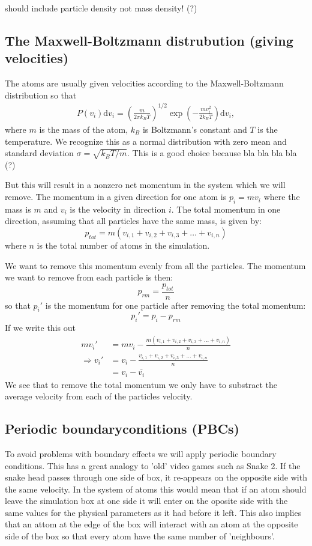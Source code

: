 \documentclass[11pt,a4wide]{article}
\newcommand{\dm}[1]{\mathrm{d}#1}
\begin{document}
should include particle density not mass density! (?)


\subsection{The Maxwell-Boltzmann distrubution (giving velocities)}
The atoms are usually given velocities according to the Maxwell-Boltzmann distribution so that
\begin{align}
	\label{eq:maxwell_boltzmann}
	P(v_i)\dm{v_i} = \left(\frac{m}{2\pi k_B T}\right)^{1/2} \exp\left(-\frac{m v_i^2}{2k_B T}\right) \dm{v_i},
\end{align}
where $m$ is the mass of the atom, $k_B$ is Boltzmann's constant and $T$ is the temperature. We recognize this as a normal distribution with zero mean and standard deviation $\sigma = \sqrt{k_B T/m}$. This is a good choice because bla bla bla bla (?) 


But this will result in a nonzero net momentum in the system which we will remove. The momentum in a given direction for one atom is $p_{i} = mv_i$ where the mass is $m$ and $v_i$ is the velocity in direction $i$. The total momentum in one direction, assuming that all particles have the same mass, is given by:
\[
p_{tot} = m(v_{i,1} + v_{i,2} + v_{i,3} + \dots + v_{i,n})
\]
where $n$ is the total number of atoms in the simulation. 

We want to remove this momentum evenly from all the particles. The momentum we want to remove from each particle is then:
\[
p_{rm} = \frac{p_{tot}}{n}
\]
so that $p_i'$ is the momentum for one particle after removing the total momentum:
\[
p_i' = p_i - p_{rm} 
\]
If we write this out
\begin{align*}
mv_i' &= mv_i - \frac{m(v_{i,1} + v_{i,2} + v_{i,3} + \dots + v_{i,n})}{n} \\
\Rightarrow v_i' &= v_i - \frac{v_{i,1} + v_{i,2} + v_{i,3} + \dots + v_{i,n}}{n} \\
&= v_i - \overline{v_i}
\end{align*}
We see that to remove the total momentum we only have to substract the average velocity from each of the particles velocity. 

\subsection{Periodic boundaryconditions (PBCs)} 
To avoid problems with boundary effects we will apply periodic boundary conditions. This has a great analogy to 'old' video games such as Snake 2. If the snake head passes through one side of box, it re-appears on the opposite side with the same velocity. In the system of atoms this would mean that if an atom should leave the simulation box at one side it will enter on the oposite side with the same values for the physical parameters as it had before it left. This also implies that an attom at the edge of the box will interact with an atom at the opposite side of the box so that every atom have the same number of 'neighbours'. 
\end{document}
